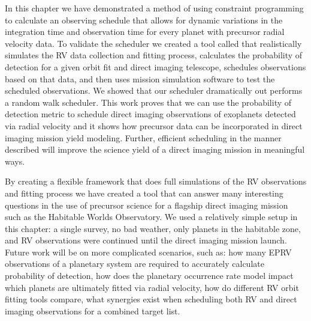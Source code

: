 In this chapter we have demonstrated a method of using constraint programming
to calculate an observing schedule that allows for dynamic variations in the
integration time and observation time for every planet with precursor radial
velocity data. To validate the scheduler we created a tool called
 that realistically simulates the RV data collection and
fitting process, calculates the probability of detection for a given orbit fit
and direct imaging telescope, schedules observations based on that data, and
then uses mission simulation software to test the scheduled observations. We
showed that our scheduler dramatically out performs a random walk scheduler.
This work proves that we can use the probability of detection metric to
schedule direct imaging observations of exoplanets detected via radial velocity
and it shows how precursor data can be incorporated in direct imaging mission
yield modeling. Further, efficient scheduling in the manner described will
improve the science yield of a direct imaging mission in meaningful ways.

By creating a flexible framework that does full simulations of the RV
observations and fitting process we have created a tool that can answer many
interesting questions in the use of precursor science for a flagship direct
imaging mission such as the Habitable Worlds Observatory. We used a relatively
simple setup in this chapter: a single survey, no bad weather, only
planets in the habitable zone, and RV observations were continued until the
direct imaging mission launch. Future work will be on more complicated
scenarios, such as: how many EPRV observations of a planetary system are
required to accurately calculate probability of detection, how does the
planetary occurrence rate model impact which planets are ultimately fitted via
radial velocity, how do different RV orbit fitting tools compare, what
synergies exist when scheduling both RV and direct imaging observations for a
combined target list.

